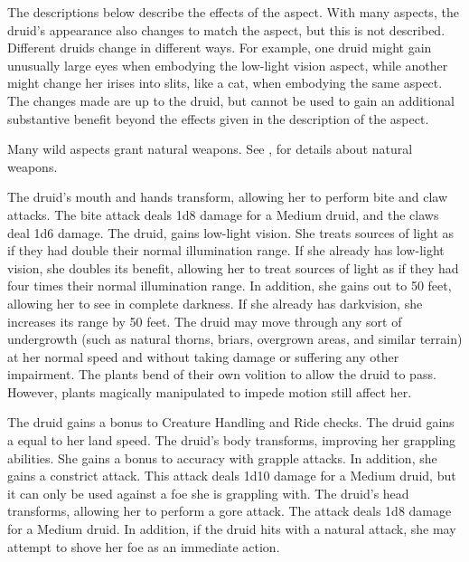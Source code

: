         The descriptions below describe the effects of the aspect.
        With many aspects, the druid's appearance also changes to match the aspect, but this is not described.
        Different druids change in different ways.
        For example, one druid might gain unusually large eyes when embodying the low-light vision aspect, while another might change her irises into slits, like a cat, when embodying the same aspect.
        The changes made are up to the druid, but cannot be used to gain an additional substantive benefit beyond the effects given in the description of the aspect.

        Many wild aspects grant natural weapons.
        See , for details about natural weapons.

        The druid's mouth and hands transform, allowing her to perform bite and claw attacks.
        The bite attack deals 1d8 damage for a Medium druid, and the claws deal 1d6 damage.
        The druid, gains low-light vision.
        She treats sources of light as if they had double their normal illumination range.
        If she already has low-light vision, she doubles its benefit, allowing her to treat sources of light as if they had four times their normal illumination range.
        In addition, she gains  out to 50 feet, allowing her to see in complete darkness.
        If she already has darkvision, she increases its range by 50 feet.
        The druid may move through any sort of undergrowth (such as natural thorns, briars, overgrown areas, and similar terrain) at her normal speed and without taking damage or suffering any other impairment.
        The plants bend of their own volition to allow the druid to pass.
        However, plants magically manipulated to impede motion still affect her.

        The druid gains a  bonus to Creature Handling and Ride checks.
        The druid gains a  equal to her land speed.
        The druid's body transforms, improving her grappling abilities.
        She gains a  bonus to accuracy with grapple attacks.
        In addition, she gains a constrict attack.
        This attack deals 1d10 damage for a Medium druid, but it can only be used against a foe she is grappling with.
        The druid's head transforms, allowing her to perform a gore attack.
        The attack deals 1d8 damage for a Medium druid.
        In addition, if the druid hits with a natural attack, she may attempt to shove her foe as an immediate action.

